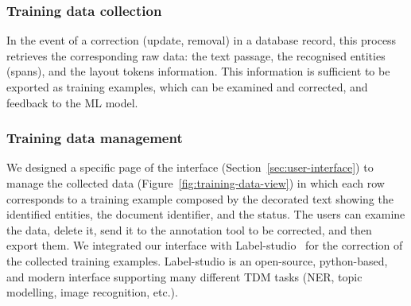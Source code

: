 \subsubsection{Training data collection}
In the event of a correction (update, removal) in a database record, this process retrieves the corresponding raw data: the text passage, the recognised entities (spans), and the layout tokens information. 
This information is sufficient to be exported as training examples, which can be examined and corrected, and feedback to the ML model. 

\subsubsection{Training data management}
We designed a specific page of the interface (Section~\ref{sec:user-interface}) to manage the collected data (Figure~\ref{fig:training-data-view}) in which each row corresponds to a training example composed by the decorated text showing the identified entities, the document identifier, and the status. 
The users can examine the data, delete it, send it to the annotation tool to be corrected, and then export them.
We integrated our interface with Label-studio~\cite{Label_Studio} for the correction of the collected training examples. 
Label-studio is an open-source, python-based, and modern interface supporting many different TDM tasks (NER, topic modelling, image recognition, etc.). 

